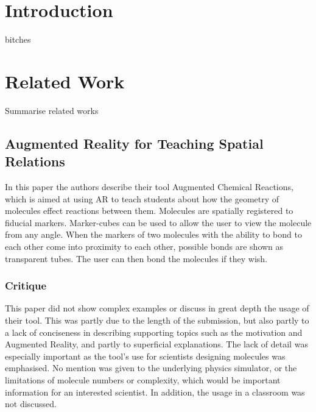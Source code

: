 \maketitle
\IEEEdisplaynotcompsoctitleabstractindextext
\IEEEpeerreviewmaketitle
\section{Introduction}

 bitches

\section{Related Work}
Summarise related works
\subsection{Augmented Reality for Teaching Spatial Relations}
In this paper\cite{Maier09} the authors describe their tool Augmented Chemical Reactions, which is aimed at using AR to teach students about how the geometry of molecules effect reactions between them. Molecules are spatially registered to fiducial markers. Marker-cubes can be used to allow the user to view the molecule from any angle. When the markers of two molecules with the ability to bond to each other come into proximity to each other, possible bonds are shown as transparent tubes. The user can then bond the molecules if they wish.

\subsubsection{Critique}
This paper did not show complex examples or discuss in great depth the usage of their tool. This was partly due to the length of the submission, but also partly to a lack of conciseness in describing supporting topics such as the motivation and Augmented Reality, and partly to superficial explanations. The lack of detail was especially important as the tool's use for scientists designing molecules was emphasised. No mention was given to the underlying physics simulator, or the limitations of molecule numbers or complexity, which would be important information for an interested scientist. In addition, the usage in a classroom was not discussed.


